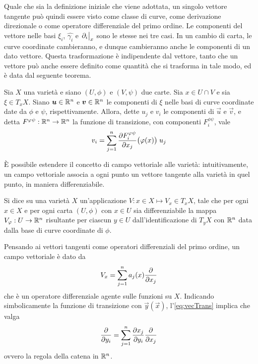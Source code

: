 Quale che sia la definizione iniziale che viene adottata, un singolo vettore tangente può quindi essere visto come classe di curve, come derivazione direzionale o come operatore differenziale del primo ordine. Le componenti del vettore nelle basi  $\xi_i$, $\hat{\gamma_i}$ e $\eval{\partial_i}_x$ sono le stesse nei tre casi. In un cambio di carta, le curve coordinate cambieranno, e dunque cambieranno anche le componenti di un dato vettore. Questa trasformazione è indipendente dal vettore, tanto che un vettore può anche essere definito come quantità che si trasforma in tale modo, ed è data dal seguente teorema.
\begin{theorem} 
  Sia $X$ una varietà e siano $(U,\phi)$ e $(V,\psi)$ due carte. Sia $x \in  U \cap V$ e sia $\xi \in  T_x X$. Siano $\boldsymbol{u} \in \mathbb{R}^{n}$ e $\boldsymbol{v} \in  \mathbb{R}^{n}$ le componenti di $\xi$ nelle basi di curve coordinate date da $\phi$ e $\psi$, rispettivamente. Allora, dette $u_j$ e $v_i$ le componenti di $\vec{u}$ e $\vec{v}$, e detta $F^{\varphi\psi}:\mathbb{R}^{n} \to \mathbb{R}^{n}$ la funzione di transizione, con componenti $F^{\phi \psi}_i$, vale \begin{equation} \label{eq:vecTrans}
  v_i = \sum_{j=1}^n \pdv{F^{\varphi\psi}_i}{x_j}\big(\varphi(x)\big)\; u_j
  \end{equation} 
\end{theorem}

È possibile estendere il concetto di campo vettoriale alle varietà: intuitivamente, un campo vettoriale associa a ogni punto un vettore tangente alla varietà in quel punto, in maniera differenziabile.
\begin{definition} \label{def:vecField}
  Si dice  su una varietà $X$ un'applicazione $V: x \in  X \mapsto V_x \in T_x X$, tale che per ogni $x \in X$ e per ogni carta $(U, \phi)$ con $x \in U$ sia differenziabile la mappa $V_\varphi:U \to \mathbb{R}^{n}$ risultante per ciascun $y \in  U$ dall'identificazione di $T_y X$ con $\mathbb{R}^{n}$ data dalla base di curve coordinate di $\phi$.
\end{definition}

Pensando ai vettori tangenti come operatori differenziali del primo ordine, un campo vettoriale è dato da
\begin{equation}
  V_x = \sum_{j=1}^{n} a_j(x) \pdv{x_j}
\end{equation} 
che è un operatore differenziale agente sulle funzioni su $X$. Indicando simbolicamente la funzione di transizione con $\vec{y}(\vec{x})$, l'\autoref{eq:vecTrans} implica che valga 
\begin{equation}
  \pdv{y_i} = \sum_{j=1}^{n} \pdv{x_j}{y_i} \pdv{x_j}
\end{equation} 
ovvero la regola della catena in $\mathbb{R}^{n}$.

